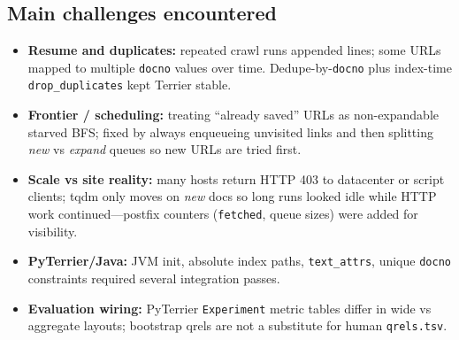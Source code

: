 \subsection*{Main challenges encountered}
\begin{itemize}
  \item \textbf{Resume and duplicates:} repeated crawl runs appended lines; some URLs mapped to multiple \texttt{docno} values over time. Dedupe-by-\texttt{docno} plus index-time \texttt{drop\_duplicates} kept Terrier stable.
  \item \textbf{Frontier / scheduling:} treating ``already saved'' URLs as non-expandable starved BFS; fixed by always enqueueing unvisited links and then splitting \emph{new} vs \emph{expand} queues so new URLs are tried first.
  \item \textbf{Scale vs site reality:} many hosts return HTTP 403 to datacenter or script clients; tqdm only moves on \emph{new} docs so long runs looked idle while HTTP work continued---postfix counters (\texttt{fetched}, queue sizes) were added for visibility.
  \item \textbf{PyTerrier/Java:} JVM init, absolute index paths, \texttt{text\_attrs}, unique \texttt{docno} constraints required several integration passes.
  \item \textbf{Evaluation wiring:} PyTerrier \texttt{Experiment} metric tables differ in wide vs aggregate layouts; bootstrap qrels are not a substitute for human \texttt{qrels.tsv}.
\end{itemize}
